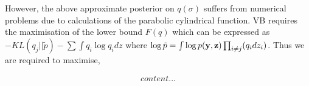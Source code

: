 \documentclass{article}
\begin{document}
However, the above approximate posterior on $q(\sigma)$ suffers from numerical problems due to calculations of the parabolic cylindrical function. VB requires the maximisation of the lower bound $F(q)$ which can be expressed as $-KL(q_j||\tilde{p})-\sum\int q_i\log q_i dz$ where $\log\tilde{p}=\int \log p(\mathbf{y},\mathbf{z})\prod_{i\ne j}(q_i dz_i)$. Thus we are required to maximise,

\begin{align}
content...
\end{align}


\end{document}
